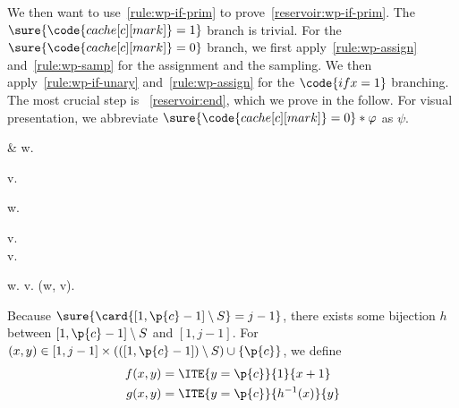 \documentclass[acmsmall,nonacm,screen,appendix]{acmart}
\begin{document}
We then want to use~\ref{rule:wp-if-prim} to prove~\eqref{reservoir:wp-if-prim}.
The $\sure{\code{cache[c][mark]} = 1}$ branch is trivial.
For the $\sure{\code{cache[c][mark]} = 0}$ branch,
we first apply~\ref{rule:wp-assign} and~\ref{rule:wp-samp} for the assignment and
the sampling. We then apply~\ref{rule:wp-if-unary} and~\ref{rule:wp-assign}
for the $\code{if x = 1}$ branching.
The most crucial step is ~\eqref{reservoir:end}, which we prove in the follow.
For visual presentation,
we abbreviate $\sure{\code{cache[c][mark]} = 0} \ast \varphi$ as $\psi$.
\begin{eqexplain}
&\CMod{\Unif{[1, j]}} w.
              \begin{grp}
                 \implies {} v.\\
                 \implies {}
              \end{grp}
              \ast \psi
              \ast {}
      \whichproves
\CMod{\Unif{[1, j]}} w.
              \begin{grp}
                 \implies {} v.\\
                 \implies {} v. 
              \end{grp}
              \ast \psi
              \ast {}
      \whichproves
\CMod{\Unif{[1, j]}} w.
               v. 
              \ast \psi
              \ast {}
      \whichproves
{} (w, v).  
              \ast \psi
              \ast {}
\end{eqexplain}
Because  $\sure{\card{[1, \p{c} - 1] \setminus S} = j - 1}$,
there exists some bijection $h$ between $[1, \p{c} - 1] \setminus S$
and $[1, j-1]$.
For $(x, y) \in [1, j - 1] \times (([1, \p{c} - 1]) \setminus S) \cup \{\p{c}\}$,
we define
\begin{align*}
f(x, y) &= \ITE{y = \p{c}}{1}{x + 1} \\
g(x, y) &= \ITE{y = \p{c}}{h^{-1}(x)}{y}
\end{align*}
\end{document}
